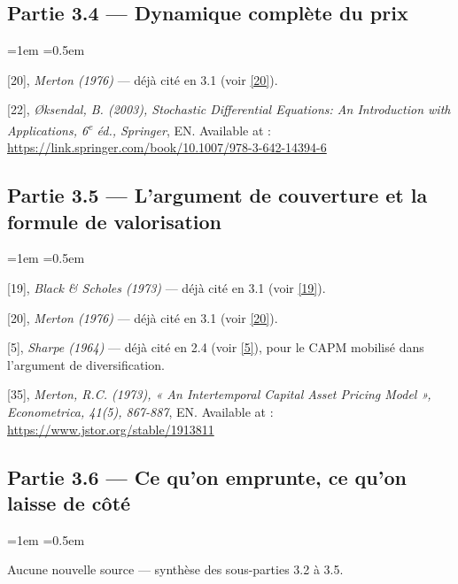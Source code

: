 \documentclass{article}
\providecommand{\up}[1]{\textsuperscript{#1}}
\begin{document}
\subsection*{Partie 3.4 --- Dynamique complète du prix}
\begin{list}{}{\leftmargin=1em \itemsep=0.5em}
\item \hypertarget{ref20}{} [20], \textit{Merton (1976)} --- déjà cité en 3.1 (voir \hyperlink{ref20}{[20]}).
\item \hypertarget{ref22}{} [22], \textit{Øksendal, B. (2003), Stochastic Differential Equations: An Introduction with Applications, 6\up{e} éd., Springer}, EN. Available at : \url{https://link.springer.com/book/10.1007/978-3-642-14394-6}
\end{list}
\subsection*{Partie 3.5 --- L'argument de couverture et la formule de valorisation}
\begin{list}{}{\leftmargin=1em \itemsep=0.5em}
\item \hypertarget{ref19}{} [19], \textit{Black \& Scholes (1973)} --- déjà cité en 3.1 (voir \hyperlink{ref19}{[19]}).
\item \hypertarget{ref20}{} [20], \textit{Merton (1976)} --- déjà cité en 3.1 (voir \hyperlink{ref20}{[20]}).
\item \hypertarget{ref5}{} [5], \textit{Sharpe (1964)} --- déjà cité en 2.4 (voir \hyperlink{ref5}{[5]}), pour le CAPM mobilisé dans l'argument de diversification.
\item \hypertarget{ref35}{} [35], \textit{Merton, R.C. (1973), « An Intertemporal Capital Asset Pricing Model », Econometrica, 41(5), 867-887}, EN. Available at : \url{https://www.jstor.org/stable/1913811}
\end{list}
\subsection*{Partie 3.6 --- Ce qu'on emprunte, ce qu'on laisse de côté}
\begin{list}{}{\leftmargin=1em \itemsep=0.5em}
\item Aucune nouvelle source --- synthèse des sous-parties 3.2 à 3.5.
\end{list}
\end{document}
